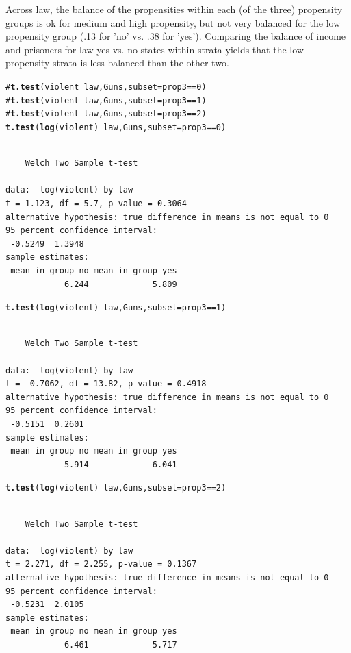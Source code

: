 \documentclass{article}\usepackage{graphicx, color}
\makeatletter
\newcommand{\hlfunctioncall}[1]{\textcolor[rgb]{0.501960784313725,0,0.329411764705882}{\textbf{#1}}}%
\newcommand{\hlcomment}[1]{\textcolor[rgb]{0.180392156862745,0.6,0.341176470588235}{#1}}%
\newenvironment{kframe}{%
 \def\at@end@of@kframe{}%
 \ifinner\ifhmode%
  \def\at@end@of@kframe{\end{minipage}}%
  \begin{minipage}{\columnwidth}%
 \fi\fi%
 \def\FrameCommand##1{\hskip\@totalleftmargin \hskip-\fboxsep
 \colorbox{shadecolor}{##1}\hskip-\fboxsep
     \hskip-\linewidth \hskip-\@totalleftmargin \hskip\columnwidth}%
 \MakeFramed {\advance\hsize-\width
   \@totalleftmargin\z@ \linewidth\hsize
   \@setminipage}}%
 {\par\unskip\endMakeFramed%
 \at@end@of@kframe}
\newenvironment{knitrout}{}{} %
\makeatother
\begin{document}
Across law, the balance of the propensities within each (of the three) propensity groups is ok for medium and high propensity, but not very balanced for the low propensity group (.13 for 'no' vs. .38 for 'yes'). 
Comparing the balance of income and prisoners for law yes vs. no states within strata yields that the low propensity strata is less balanced than the other two.
\begin{knitrout}
\color{fgcolor}\begin{kframe}
\begin{alltt}
\hlcomment{#\hlfunctioncall{t.test}(violent~law, Guns, subset=prop3==0)}
\hlcomment{#\hlfunctioncall{t.test}(violent~law, Guns, subset=prop3==1)}
\hlcomment{#\hlfunctioncall{t.test}(violent~law, Guns, subset=prop3==2)}
\hlfunctioncall{t.test}(\hlfunctioncall{log}(violent)~law, Guns, subset=prop3==0)
\end{alltt}
\begin{verbatim}

	Welch Two Sample t-test

data:  log(violent) by law 
t = 1.123, df = 5.7, p-value = 0.3064
alternative hypothesis: true difference in means is not equal to 0 
95 percent confidence interval:
 -0.5249  1.3948 
sample estimates:
 mean in group no mean in group yes 
            6.244             5.809 

\end{verbatim}
\begin{alltt}
\hlfunctioncall{t.test}(\hlfunctioncall{log}(violent)~law, Guns, subset=prop3==1)
\end{alltt}
\begin{verbatim}

	Welch Two Sample t-test

data:  log(violent) by law 
t = -0.7062, df = 13.82, p-value = 0.4918
alternative hypothesis: true difference in means is not equal to 0 
95 percent confidence interval:
 -0.5151  0.2601 
sample estimates:
 mean in group no mean in group yes 
            5.914             6.041 

\end{verbatim}
\begin{alltt}
\hlfunctioncall{t.test}(\hlfunctioncall{log}(violent)~law, Guns, subset=prop3==2)
\end{alltt}
\begin{verbatim}

	Welch Two Sample t-test

data:  log(violent) by law 
t = 2.271, df = 2.255, p-value = 0.1367
alternative hypothesis: true difference in means is not equal to 0 
95 percent confidence interval:
 -0.5231  2.0105 
sample estimates:
 mean in group no mean in group yes 
            6.461             5.717 

\end{verbatim}
\end{kframe}
\end{knitrout}
\end{document}

